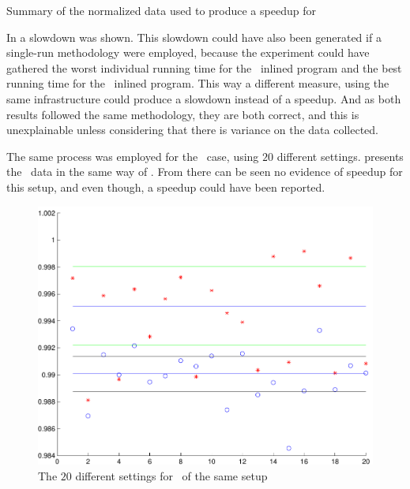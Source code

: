 \begin{table}
  \centering
  \begin{tiny}
  
  \end{tiny}
  \caption{Summary of the normalized data used to produce a speedup for \bzip}
  \label{tab:fullexp}
\end{table}

In  a slowdown was shown. This slowdown could have also been generated if a single-run methodology were employed, because the experiment could have gathered the worst individual running time for the \FDI\ inlined program and the best running time for the \llvm\ inlined program. This way a different measure, using the same infrastructure could produce a slowdown instead of a speedup. And as both results followed the same methodology, they are both correct, and this is unexplainable unless considering that there is variance on the data collected.

The same process was employed for the \gzip\ case, using $20$ different settings.  presents the \gzip\ data in the same way of . From  there can be seen no evidence of speedup for this setup, and even though, a speedup could have been reported.

\begin{figure}
  \centering
  \includegraphics[width=1.00\linewidth]{Figures/gzipfdll}
  \caption{The $20$ different settings for \gzip\ of the same setup}
  \label{fig:gzipfdll}
\end{figure}

